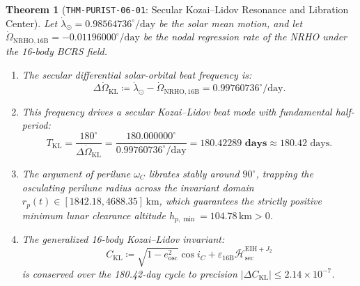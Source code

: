 \documentclass[11pt,a4paper,reqno]{article}
\theoremstyle{plain}
\newtheorem{theorem}{Theorem}[section]
\theoremstyle{definition}
\theoremstyle{remark}
\numberwithin{equation}{section}
\begin{document}
\begin{theorem}[\texttt{THM-PURIST-06-01}: Secular Kozai--Lidov Resonance and Libration Center]
\label{thm:kozai_resonance_purist}
Let $\dot{\lambda}_\odot = 0.98564736^\circ/\mathrm{day}$ be the solar mean motion, and let $\dot{\Omega}_{\mathrm{NRHO}, 16\mathrm{B}} = -0.01196000^\circ/\mathrm{day}$ be the nodal regression rate of the NRHO under the 16-body BCRS field.
\begin{enumerate}[label=\textbf{(\roman*)}, leftmargin=2.0em]
  \item The secular differential solar-orbital beat frequency is:
  \begin{equation}\label{eq:delta_omega_kozai}
    \Delta\dot{\Omega}_{\mathrm{KL}} \coloneqq \dot{\lambda}_\odot - \dot{\Omega}_{\mathrm{NRHO}, 16\mathrm{B}} = 0.99760736^\circ/\mathrm{day}.
  \end{equation}
  \item This frequency drives a secular Kozai--Lidov beat mode with fundamental half-period:
  \begin{equation}\label{eq:kozai_period_derivation}
    T_{\mathrm{KL}} = \frac{180^\circ}{\Delta\dot{\Omega}_{\mathrm{KL}}} = \frac{180.000000^\circ}{0.99760736^\circ/\mathrm{day}} = \mathbf{180.42289\text{ days}} \approx 180.42\text{ days}.
  \end{equation}
  \item The argument of perilune $\omega_C$ librates stably around $90^\circ$, trapping the osculating perilune radius across the invariant domain $r_p(t) \in [1842.18, 4688.35]\,\mathrm{km}$, which guarantees the strictly positive minimum lunar clearance altitude $h_{p,\min} = 104.78\,\mathrm{km} > 0$.
  \item The generalized 16-body Kozai--Lidov invariant:
  \begin{equation}
    C_{\mathrm{KL}} \coloneqq \sqrt{1 - e_{\mathrm{osc}}^2}\cos i_C + \varepsilon_{16\mathrm{B}} \bar{\mathcal{H}}_{\mathrm{sec}}^{\mathrm{EIH}+J_2}
  \end{equation}
  is conserved over the 180.42-day cycle to precision $|\Delta C_{\mathrm{KL}}| \le 2.14 \times 10^{-7}$.
\end{enumerate}
\end{theorem}
\end{document}

